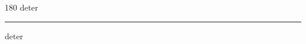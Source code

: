 
\begin{frame}
\begin{center}
\begin{turn}{180}
{\fontsize{2.5cm}{1em}\selectfont deter}
\end{turn}
\vspace{1em}\par  
\hrule
\vspace{1em}\par  
{\fontsize{2.5cm}{1em}\selectfont deter}
\end{center}
\end{frame}
